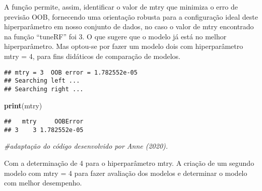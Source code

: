 \documentclass[
]{article}
\newenvironment{Shaded}{\begin{snugshade}}{\end{snugshade}}
\newcommand{\AttributeTok}[1]{\textcolor[rgb]{0.13,0.29,0.53}{#1}}
\newcommand{\CommentTok}[1]{\textcolor[rgb]{0.56,0.35,0.01}{\textit{#1}}}
\newcommand{\ConstantTok}[1]{\textcolor[rgb]{0.56,0.35,0.01}{#1}}
\newcommand{\DecValTok}[1]{\textcolor[rgb]{0.00,0.00,0.81}{#1}}
\newcommand{\FloatTok}[1]{\textcolor[rgb]{0.00,0.00,0.81}{#1}}
\newcommand{\FunctionTok}[1]{\textcolor[rgb]{0.13,0.29,0.53}{\textbf{#1}}}
\newcommand{\NormalTok}[1]{#1}
\newcommand{\OtherTok}[1]{\textcolor[rgb]{0.56,0.35,0.01}{#1}}
\newcommand{\SpecialCharTok}[1]{\textcolor[rgb]{0.81,0.36,0.00}{\textbf{#1}}}
\begin{document}
A função permite, assim, identificar o valor de mtry que minimiza o erro
de previsão OOB, fornecendo uma orientação robusta para a configuração
ideal deste hiperparâmetro em nosso conjunto de dados, no caso o valor
de mtry encontrado na função ``tuneRF'' foi 3. O que sugere que o modelo
já está no melhor hiperparâmetro. Mas optou-se por fazer um modelo dois
com hiperparâmetro mtry = 4, para fins didáticos de comparação de
modelos.

\begin{Shaded}
\end{Shaded}

\begin{verbatim}
## mtry = 3  OOB error = 1.782552e-05 
## Searching left ...
## Searching right ...
\end{verbatim}

\begin{Shaded}
\begin{Highlighting}[]
\FunctionTok{print}\NormalTok{(mtry)}
\end{Highlighting}
\end{Shaded}

\begin{verbatim}
##   mtry     OOBError
## 3    3 1.782552e-05
\end{verbatim}

\begin{Shaded}
\begin{Highlighting}[]
\CommentTok{\#adaptação do código desenvolvido por Anne (2020).}
\end{Highlighting}
\end{Shaded}

Com a determinação de 4 para o hiperparâmetro mtry. A criação de um
segundo modelo com mtry = 4 para fazer avaliação dos modelos e
determinar o modelo com melhor desempenho.
\end{document}
